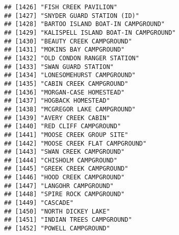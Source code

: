 \documentclass[
]{article}
\begin{document}
\begin{verbatim}
## [1426] "FISH CREEK PAVILION"                                                                 
## [1427] "SNYDER GUARD STATION (ID)"                                                           
## [1428] "BARTOO ISLAND BOAT-IN CAMPGROUND"                                                    
## [1429] "KALISPELL ISLAND BOAT-IN CAMPGROUND"                                                 
## [1430] "BEAUTY CREEK CAMPGROUND"                                                             
## [1431] "MOKINS BAY CAMPGROUND"                                                               
## [1432] "OLD CONDON RANGER STATION"                                                           
## [1433] "SWAN GUARD STATION"                                                                  
## [1434] "LONESOMEHURST CAMPGROUND"                                                            
## [1435] "CABIN CREEK CAMPGROUND"                                                              
## [1436] "MORGAN-CASE HOMESTEAD"                                                               
## [1437] "HOGBACK HOMESTEAD"                                                                   
## [1438] "MCGREGOR LAKE CAMPGROUND"                                                            
## [1439] "AVERY CREEK CABIN"                                                                   
## [1440] "RED CLIFF CAMPGROUND"                                                                
## [1441] "MOOSE CREEK GROUP SITE"                                                              
## [1442] "MOOSE CREEK FLAT CAMPGROUND"                                                         
## [1443] "SWAN CREEK CAMPGROUND"                                                               
## [1444] "CHISHOLM CAMPGROUND"                                                                 
## [1445] "GREEK CREEK CAMPGROUND"                                                              
## [1446] "HOOD CREEK CAMPGROUND"                                                               
## [1447] "LANGOHR CAMPGROUND"                                                                  
## [1448] "SPIRE ROCK CAMPGROUND"                                                               
## [1449] "CASCADE"                                                                             
## [1450] "NORTH DICKEY LAKE"                                                                   
## [1451] "INDIAN TREES CAMPGROUND"                                                             
## [1452] "POWELL CAMPGROUND"                                                                   

\end{verbatim}
\end{document}
